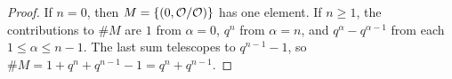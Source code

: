 \begin{proof}
If $n=0$, then $M=\{(0,\mathcal{O}/\mathcal{O})\}$ has one element. If $n\ge1$, the contributions to $\#M$ are $1$ from $\alpha=0$,
$q^n$ from $\alpha=n$, and $q^\alpha-q^{\alpha-1}$ from each $1\le\alpha\le n-1$. The last sum telescopes to
$q^{n-1}-1$, so $\#M=1+q^n+q^{n-1}-1=q^n+q^{n-1}$.
\end{proof}

\begin{tfoutline}
\end{tfoutline}
